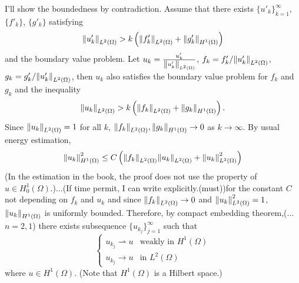 \documentclass{article}
\begin{document}
I'll show the boundedness by contradiction. Assume that there exists $\{u'_k\}_{k=1}^\infty$, $\{f'_k\}$, $\{g'_k\}$ satisfying
\begin{equation*}
\norm{u'_k}_{L^2(\Omega)}>k\left(\norm{f'_k}_{L^2(\Omega)}+\norm{g'_k}_{H^1(\Omega)}\right)
\end{equation*}
and the boundary value problem. Let $u_k=\frac{u'_k}{\norm{u'_k}_{L^2(\Omega)}}$, $f_k=f'_k/{\norm{u'_k}_{L^2(\Omega)}}$, $g_k=g'_k/{\norm{u'_k}_{L^2(\Omega)}}$, then $u_k$ also satisfies the boundary value problem for $f_k$ and $g_k$ and the inequality
\begin{equation*}
\norm{u_k}_{L^2(\Omega)}>k\left(\norm{f_k}_{L^2(\Omega)}+\norm{g_k}_{H^1(\Omega)}\right).
\end{equation*}
Since $\norm{u_k}_{L^2(\Omega)}=1$ for all $k$, $\norm{f_k}_{L^2(\Omega)}, \norm{g_k}_{H^1(\Omega)}\rightarrow 0$ as $k\rightarrow \infty$. By usual energy estimation,
\begin{equation*}
\norm{u_k}^2_{H^1(\Omega)}\leq C\left(\norm{f_k}_{L^2(\Omega)}\norm{u_k}_{L^2(\Omega)}+\norm{u_k}^2_{L^2(\Omega)}\right)
\end{equation*}
(In the estimation in the book, the proof does not use the property of $u\in H^1_0(\Omega)$.)...(If time permit, I can write explicitly.(must))for the constant $C$ not depending on $f_k$ and $u_k$ and since $\norm{f_k}_{L^2(\Omega)}\rightarrow 0$ and $\norm{u_k}^2_{L^2(\Omega)}=1$, $\norm{u_k}_{H^1(\Omega)}$ is uniformly bounded. Therefore, by compact embedding theorem,(...$n=2,1$) there exists subsequence $\{u_{k_j}\}_{j=1}^\infty$ such that
\begin{equation*}
\begin{cases}
u_{k_j}\rightharpoonup u & \text{weakly in }H^1(\Omega) \\
u_{k_j}\rightarrow u & \text{in }L^2(\Omega)
\end{cases}
\end{equation*}
where $u\in H^1(\Omega)$. (Note that $H^1(\Omega)$ is a Hilbert space.)
\end{document}
